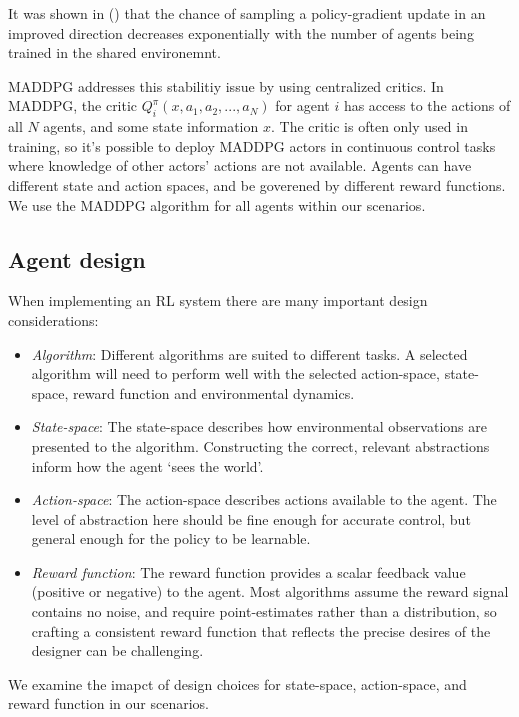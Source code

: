 \documentclass[11pt,a4paper]{article}
\begin{document}
It was shown in () that the chance of sampling a policy-gradient update in an improved direction decreases exponentially with the number of agents being trained in the shared environemnt.

MADDPG addresses this stabilitiy issue by using centralized critics.
In MADDPG, the critic $Q^\pi_i(x, a_1, a_2, ..., a_N)$ for agent $i$ has access to the actions of all $N$ agents, and some state information $x$.
The critic is often only used in training, so it's possible to deploy MADDPG actors in continuous control tasks where knowledge of other actors' actions are not available.
Agents can have different state and action spaces, and be goverened by different reward functions.
We use the MADDPG algorithm for all agents within our scenarios.

\subsection{Agent design}

When implementing an RL system there are many important design considerations:

\begin{itemize}
  \item \emph{Algorithm}: Different algorithms are suited to different tasks. A selected algorithm will need to perform well with the selected action-space, state-space, reward function and environmental dynamics.
  \item \emph{State-space}: The state-space describes how environmental observations are presented to the algorithm. Constructing the correct, relevant abstractions inform how the agent `sees the world'.
  \item \emph{Action-space}: The action-space describes actions available to the agent. The level of abstraction here should be fine enough for accurate control, but general enough for the policy to be learnable.
  \item \emph{Reward function}: The reward function provides a scalar feedback value (positive or negative) to the agent. Most algorithms assume the reward signal contains no noise, and require point-estimates rather than a distribution, so crafting a consistent reward function that reflects the precise desires of the designer can be challenging.
\end{itemize}

We examine the imapct of design choices for state-space, action-space, and reward function in our scenarios.
\end{document}
